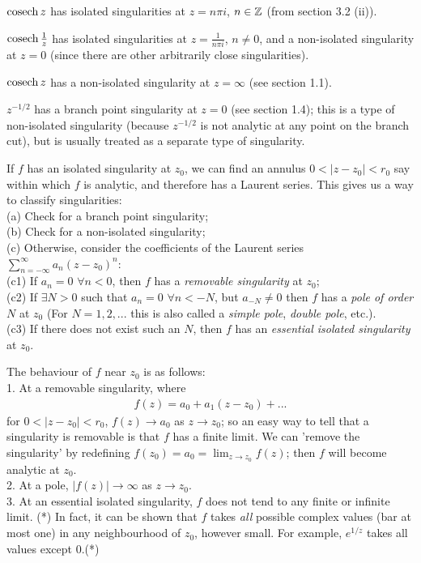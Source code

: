 \documentclass[a4paper]{article}
\begin{document}
\begin{eg}
$\operatorname{cosech} z$ has isolated singularities at $z=n\pi i$, $n \in \mathbb{Z}$ (from section 3.2 (ii)).
\end{eg}

\begin{eg}
$\operatorname{cosech} \frac{1}{z}$ has isolated singularities at $z=\frac{1}{n\pi i}$, $n\neq 0$, and a non-isolated singularity at $z=0$ (since there are other arbitrarily close singularities).
\end{eg}

\begin{eg}
$\operatorname{cosech} z$ has a non-isolated singularity at $z=\infty$ (see section 1.1).
\end{eg}

\begin{eg}
$z^{-1/2}$ has a branch point singularity at $z=0$ (see section 1.4); this is a type of non-isolated singularity (because $z^{-1/2}$ is not analytic at any point on the branch cut), but is usually treated as a separate type of singularity.
\end{eg}

If $f$ has an isolated singularity at $z_0$, we can find an annulus $0<|z-z_0|<r_0$ say within which $f$ is analytic, and therefore has a Laurent series. This gives us a way to classify singularities:\\
(a) Check for a branch point singularity;\\
(b) Check for a non-isolated singularity;\\
(c) Otherwise, consider the coefficients of the Laurent series $\sum_{n=-\infty}^\infty a_n (z-z_0)^n$:\\
(c1) If $a_n=0$ $\forall n<0$, then $f$ has a \emph{removable singularity} at $z_0$;\\
(c2) If $\exists N>0$ such that $a_n = 0$ $\forall n < -N$, but $a_{-N} \neq 0$ then $f$ has a \emph{pole of order $N$} at $z_0$ (For $N=1,2,...$ this is also called a \emph{simple pole}, \emph{double pole}, etc.).\\
(c3) If there does not exist such an $N$, then $f$ has an \emph{essential isolated singularity} at $z_0$.

The behaviour of $f$ near $z_0$ is as follows:\\
1. At a removable singularity, where
\begin{equation*}
\begin{aligned}
f(z) = a_0 + a_1 (z-z_0)+...
\end{aligned}
\end{equation*}
for $0<|z-z_0|<r_0$, $f(z) \to a_0$ as $z \to z_0$; so an easy way to tell that a singularity is removable is that $f$ has a finite limit. We can 'remove the singularity' by redefining $f(z_0) = a_0 = \lim_{z \to z_0} f(z)$; then $f$ will become analytic at $z_0$.\\
2. At a pole, $|f(z)| \to \infty$ as $z \to z_0$.\\
3. At an essential isolated singularity, $f$ does not tend to any finite or infinite limit. (*) In fact, it can be shown that $f$ takes \emph{all} possible complex values (bar at most one) in any neighbourhood of $z_0$, however small. For example, $e^{1/z}$ takes all values except $0$.(*)
\end{document}
